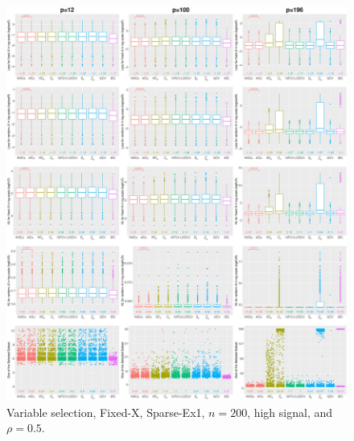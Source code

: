 \begin{figure}[!ht]
\centering
\includegraphics[width=\textwidth]{figures/supplement/fixedx/subset_selection/Sparse-Ex1_n200_hsnr_rho05.eps}
\caption{Variable selection, Fixed-X, Sparse-Ex1, $n=200$, high signal, and $\rho=0.5$.}
\end{figure}
\clearpage
